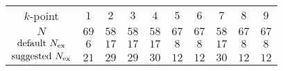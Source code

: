 \begin{tabular}{cccccccccc}
$k$-point & $1$ & $2$ & $3$ & $4$ & $5$ & $6$ & $7$ & $8$ & $9$\\
$N$ & $69$ & $58$ & $58$ & $58$ & $67$ & $67$ & $58$ & $67$ & $67$\\
$\text{default } N_{\rm ex}$ & $6$ & $17$ & $17$ & $17$ & $8$ & $8$ & $17$ & $8$ & $8$\\
$\text{suggested } N_{\rm ex}$ & $21$ & $29$ & $29$ & $30$ & $12$ & $12$ & $30$ & $12$ & $12$\\
\end{tabular}

